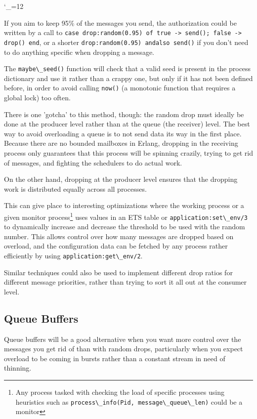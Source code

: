 \documentclass[11pt, oneside]{book}   	%
\newcommand{\function}[1]{\Verb`#1`}
\newcommand{\expression}[1]{\Verb`#1`}
\def\includecode{\begingroup
\catcode`\_=12
\includecodeB}
\newcommand{\includecodeB}[2][erlang]{\VerbatimInput[frame=lines,framesep=2mm,%
fontsize=\small]{#1/#2}\endgroup}
\begin{document}
\includecode[erlang]{drop.erl}

If you aim to keep 95\% of the messages you send, the authorization could be written by a call to \expression{case drop:random(0.95) of true -> send(); false -> drop() end}, or a shorter \expression{drop:random(0.95) andalso send()} if you don't need to do anything specific when dropping a message. 

The \function{maybe\_seed()} function will check that a valid seed is present in the process dictionary and use it rather than a crappy one, but only if it has not been defined before, in order to avoid calling \function{now()} (a monotonic function that requires a global lock) too often.

There is one 'gotcha' to this method, though: the random drop must ideally be done at the producer level rather than at the queue (the receiver) level. The best way to avoid overloading a queue is to not send data its way in the first place. Because there are no bounded mailboxes in Erlang, dropping in the receiving process only guarantees that this process will be spinning crazily, trying to get rid of messages, and fighting the schedulers to do actual work.

On the other hand, dropping at the producer level ensures that the dropping work is distributed equally across all processes.

This can give place to interesting optimizations where the working process or a given monitor process\footnote{Any process tasked with checking the load of specific processes using heuristics such as \expression{process\_info(Pid, message\_queue\_len)} could be a monitor} uses values in an ETS table or \function{application:set\_env/3} to dynamically increase and decrease the threshold to be used with the random number. This allows control over how many messages are dropped based on overload, and the configuration data can be fetched by any process rather efficiently by using \function{application:get\_env/2}.

Similar techniques could also be used to implement different drop ratios for different message priorities, rather than trying to sort it all out at the consumer level.

\subsection{Queue Buffers}

Queue buffers will be a good alternative when you want more control over the messages you get rid of than with random drops, particularly when you expect overload to be coming in bursts rather than a constant stream in need of thinning.
\end{document}
